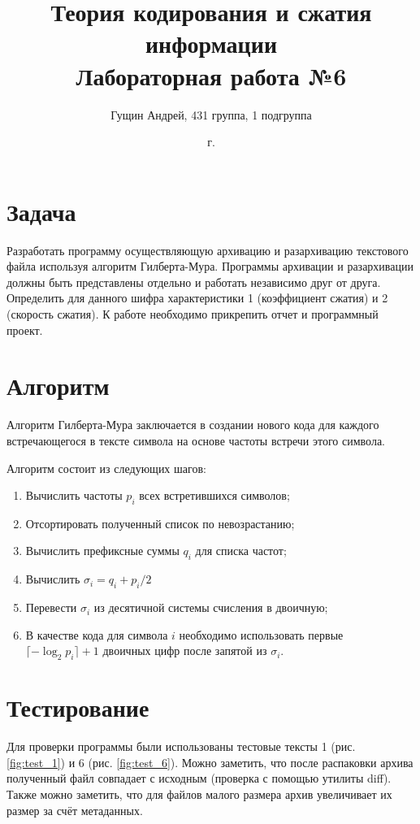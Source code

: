 \documentclass[a4paper,oneside]{article}
\title{{Теория кодирования и сжатия информации}\\{Лабораторная работа №6}}
\author{Гущин Андрей, 431 группа, 1 подгруппа}
\date{\the\year{} г.}
\theoremstyle{definition}
\begin{document}
\maketitle

\section{Задача}

Разработать программу осуществляющую архивацию и разархивацию текстового файла
используя алгоритм Гилберта-Мура. Программы архивации и разархивации должны
быть представлены отдельно и работать независимо друг от друга. Определить для
данного шифра характеристики 1 (коэффициент сжатия) и 2 (скорость сжатия). К
работе необходимо прикрепить отчет и программный проект.


\section{Алгоритм}

Алгоритм Гилберта-Мура заключается в создании нового кода для каждого
встречающегося в тексте символа на основе частоты встречи этого символа.

Алгоритм состоит из следующих шагов:
\begin{enumerate}
  \item Вычислить частоты $p_i$ всех встретившихся символов;
  \item Отсортировать полученный список по невозрастанию;
  \item Вычислить префиксные суммы $q_i$ для списка частот;
  \item Вычислить $\sigma_i = q_i + p_i / 2$
  \item Перевести $\sigma_i$ из десятичной системы счисления в двоичную;
  \item
    В качестве кода для символа $i$ необходимо использовать первые
    $\lceil -\log_2 p_i \rceil + 1$ двоичных цифр после запятой из $\sigma_i$.
\end{enumerate}


\section{Тестирование}

Для проверки программы были использованы тестовые тексты 1 (рис.
\ref{fig:test_1}) и 6 (рис. \ref{fig:test_6}). Можно заметить,
что после распаковки архива полученный файл совпадает с исходным (проверка
с помощью утилиты diff). Также можно заметить, что для файлов малого размера
архив увеличивает их размер за счёт метаданных.
\end{document}
